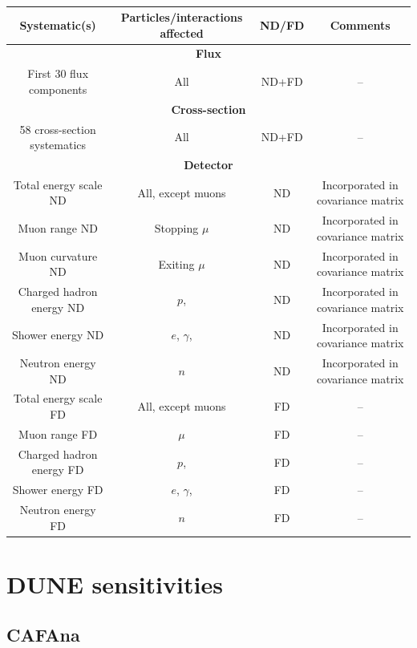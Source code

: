 \begin{table}
	\caption[]{}
	\centering
	\begin{tabular}{c c c c}
		\hline
		\hline
		Systematic(s) & Particles/interactions affected & ND/FD & Comments \\
		\hline
		\multicolumn{4}{c}{\textbf{Flux}} \\
		\hline
		First 30 flux components & All & ND+FD & -- \\
		\hline
		\multicolumn{4}{c}{\textbf{Cross-section}} \\
		\hline
		\num{58} cross-section systematics & All & ND+FD & -- \\ 
		\hline
		\multicolumn{4}{c}{\textbf{Detector}} \\
		\hline
		Total energy scale ND & All, except muons & ND & Incorporated in covariance matrix \\
		Muon range ND & Stopping $\mu$ & ND & Incorporated in covariance matrix \\
		Muon curvature ND & Exiting $\mu$ & ND & Incorporated in covariance matrix \\
		Charged hadron energy ND & $p$, \pipm & ND & Incorporated in covariance matrix \\
		Shower energy ND & $e$, $\gamma$, \pizero & ND & Incorporated in covariance matrix \\
		Neutron energy ND & $n$ & ND & Incorporated in covariance matrix \\
		
		Total energy scale FD & All, except muons & FD & -- \\
		Muon range FD & $\mu$ & FD & -- \\
		Charged hadron energy FD & $p$, \pipm & FD & -- \\
		Shower energy FD & $e$, $\gamma$, \pizero & FD & -- \\
		Neutron energy FD & $n$ & FD & -- \\
		\hline
	\end{tabular}
\end{table}

\section{DUNE sensitivities}
\label{sec:dune_lbl:sensitivities}

\subsection{CAFAna}
\label{sec:dune_lbl:sensitivities:cafana}

